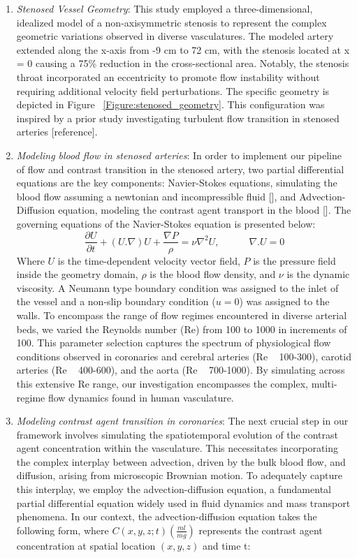 \documentclass[times,twocolumn,final]{elsarticle}
\begin{document}
\begin{enumerate}
    \item \textit{Stenosed Vessel Geometry}: This study employed a three-dimensional, idealized model of a non-axisymmetric stenosis to represent the complex geometric variations observed in diverse vasculatures. The modeled artery extended along the x-axis from -9 cm to 72 cm, with the stenosis located at x = 0 causing a 75\% reduction in the cross-sectional area. Notably, the stenosis throat incorporated an eccentricity to promote flow instability without requiring additional velocity field perturbations. The specific geometry is depicted in Figure ~\ref{Figure:stenosed_geometry}. This configuration was inspired by a prior study investigating turbulent flow transition in stenosed arteries [reference].
    \item \textit{Modeling blood flow in stenosed arteries}: In order to implement our pipeline of flow and contrast transition in the stenosed artery, two partial differential equations are the key components: Navier-Stokes equations, simulating the blood flow assuming a newtonian and incompressible fluid [], and Advection-Diffusion equation, modeling the contrast agent transport in the blood []. The governing equations of the Navier-Stokes equation is presented below:
        \begin{equation}
            \dfrac{\partial U}{\partial t} + (U. \nabla)U + \dfrac{\nabla P}{\rho} = \nu \nabla^2U,\quad \quad \quad \nabla.U=0
        \end{equation}
        Where $U$ is the time-dependent velocity vector field, $P$ is the pressure field inside the geometry domain, $\rho$ is the blood flow density, and $\nu$ is the dynamic viscosity. A Neumann type boundary condition was assigned to the inlet of the vessel and a non-slip boundary condition ($u=0$) was assigned to the walls. To encompass the range of flow regimes encountered in diverse arterial beds, we varied the Reynolds number (Re) from 100 to 1000 in increments of 100. This parameter selection captures the spectrum of physiological flow conditions observed in coronaries and cerebral arteries (Re ~ 100-300), carotid arteries (Re ~ 400-600), and the aorta (Re ~ 700-1000). By simulating across this extensive Re range, our investigation encompasses the complex, multi-regime flow dynamics found in human vasculature. 
    \item \textit{Modeling contrast agent transition in coronaries}: The next crucial step in our framework involves simulating the spatiotemporal evolution of the contrast agent concentration within the vasculature. This necessitates incorporating the complex interplay between advection, driven by the bulk blood flow, and diffusion, arising from microscopic Brownian motion. To adequately capture this interplay, we employ the advection-diffusion equation, a fundamental partial differential equation widely used in fluid dynamics and mass transport phenomena. In our context, the advection-diffusion equation takes the following form, where $C(x,y,z;t)(\frac{ml}{mg})$ represents the contrast agent concentration at spatial location $(x,y,z)$ and time t:

\end{enumerate}
\end{document}

